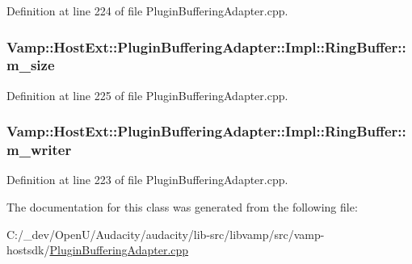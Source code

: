 Definition at line 224 of file Plugin\+Buffering\+Adapter.\+cpp.

\subsubsection[{\texorpdfstring{m\+\_\+size}{m_size}}]{ Vamp\+::\+Host\+Ext\+::\+Plugin\+Buffering\+Adapter\+::\+Impl\+::\+Ring\+Buffer\+::m\+\_\+size\hspace{0.3cm}{\ttfamily [protected]}}\hypertarget{class_vamp_1_1_host_ext_1_1_plugin_buffering_adapter_1_1_impl_1_1_ring_buffer_afe3fe238440e3afe3aa1a8d3b6270e3a}{}\label{class_vamp_1_1_host_ext_1_1_plugin_buffering_adapter_1_1_impl_1_1_ring_buffer_afe3fe238440e3afe3aa1a8d3b6270e3a}


Definition at line 225 of file Plugin\+Buffering\+Adapter.\+cpp.

\subsubsection[{\texorpdfstring{m\+\_\+writer}{m_writer}}]{ Vamp\+::\+Host\+Ext\+::\+Plugin\+Buffering\+Adapter\+::\+Impl\+::\+Ring\+Buffer\+::m\+\_\+writer\hspace{0.3cm}{\ttfamily [protected]}}\hypertarget{class_vamp_1_1_host_ext_1_1_plugin_buffering_adapter_1_1_impl_1_1_ring_buffer_a3798697f4cf46c5e9a5433e1bf160b2c}{}\label{class_vamp_1_1_host_ext_1_1_plugin_buffering_adapter_1_1_impl_1_1_ring_buffer_a3798697f4cf46c5e9a5433e1bf160b2c}


Definition at line 223 of file Plugin\+Buffering\+Adapter.\+cpp.



The documentation for this class was generated from the following file\+:\begin{DoxyCompactItemize}
\item 
C\+:/\+\_\+dev/\+Open\+U/\+Audacity/audacity/lib-\/src/libvamp/src/vamp-\/hostsdk/\hyperlink{_plugin_buffering_adapter_8cpp}{Plugin\+Buffering\+Adapter.\+cpp}\end{DoxyCompactItemize}
